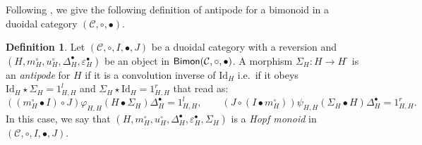 \documentclass[nosumlimits,twoside]{amsart}
\theoremstyle{definition}
\newtheorem{definition}[definition]{\sc Definition}
\theoremstyle{remark}
\def\revsn{\text{-}}
\newcommand{\id}{\mathrm{Id}}
\newcommand{\Cc}{\mathcal{C}}
\def\Bimon{{\sf Bimon}}
\begin{document}
Following \cite[Theorem 7.2]{Bohm-Lack}, we give the following definition of antipode for a bimonoid in a duoidal category $(\Cc,\circ,\bullet)$.

\begin{definition}
\label{def:Hopfmon}
Let $\left( \mathcal{C},\circ ,I,\bullet
,J\right) $ be a duoidal category  with a reversion and $\left( H,m_{H}^{\circ },u_{H}^{\circ },\Delta
_{H}^{\bullet },\varepsilon _{H}^{\bullet }\right) $ be an object in $\Bimon(\Cc,\circ,\bullet)$.
A morphism $%
\Sigma _{H}:H\rightarrow H^{\revsn }$
is an
\emph{antipode} for $H$ if it is a convolution inverse of $\id_H$ i.e.\ if it
obeys $\mathrm{Id}_{H}\star \Sigma _{H}=1_{H,H}^{l}$ and $\Sigma _{H}\star \mathrm{Id}_{H}=1_{H,H}^{r}$ that read as:
\begin{equation}\label{eq:antipode}
  (\left( m_{H}^{\circ }\bullet I\right) \circ
J)\varphi_{H,H}(H\bullet\Sigma_{H})\Delta^{\bullet}_{H}=1_{H,H}^{l},\qquad (J\circ \left( I\bullet m_{H}^{\circ
}\right))\psi_{H,H}(\Sigma_{H}\bullet H)\Delta_{H}^{\bullet}=1_{H,H}^{r}.
\end{equation}
In this case, we say that $\left( H,m_{H}^{\circ },u_{H}^{\circ
},\Delta _{H}^{\bullet },\varepsilon _{H}^{\bullet },\Sigma _{H}\right) $ is
a \emph{Hopf monoid} in $\left( \mathcal{C},\circ ,I,\bullet ,J\right) $. 


\end{definition}
\end{document}
